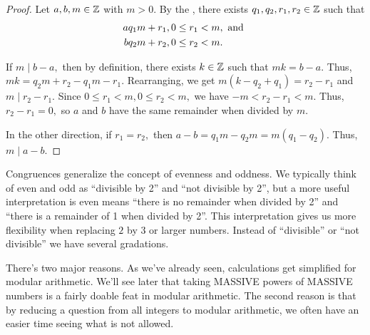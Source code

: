 \documentclass[letterpaper, 11 pt]{ximera}
\begin{document}
\begin{proof}
Let $a,b,m\in\mathbb Z$ with $m> 0.$ By the , there exists $q_1,q_2,r_1,r_2\in\mathbb Z$ such that \begin{align*}
                    a & q_1 m +r_1, 0\leq r_1< m, \textnormal{ and }\\
                    b & q_2 m +r_2, 0\leq r_2< m.
                \end{align*}
            
            
                If $m\mid b-a,$ then by definition, there exists $k\in\mathbb Z$ such that $mk=b-a.$ Thus, $mk=q_2 m+r_2-q_1 m-r_1.$ Rearranging, we get 
                $m(k-q_2+q_1)=r_2-r_1$ and $m\mid r_2-r_1.$ Since 
                $0\leq r_1< m, 0\leq r_2< m,$ we have 
                $-m< r_2-r_1< m.$ Thus, $r_2-r_1=0,$ so $a$ and $b$ have the same remainder when divided by $m$.
            

            
                In the other direction, if $r_1=r_2,$ then $a-b=q_1 m-q_2 m=m(q_1-q_2).$ Thus, $m\mid a-b.$
\end{proof}

Congruences generalize the concept of evenness and oddness. We typically think of even and odd as ``divisible by 2'' and ``not divisible by 2'', but a more useful interpretation is even means ``there is no remainder when divided by 2'' and ``there is a remainder of 1 when divided by 2''. This interpretation gives us more flexibility when replacing $2$ by $3$ or larger numbers. Instead of ``divisible'' or ``not divisible'' we have several gradations.

There's two major reasons. As we've already seen, calculations get simplified for modular arithmetic. We'll see later that taking MASSIVE powers of MASSIVE numbers is a fairly doable feat in modular arithmetic. The second reason is that by reducing a question from all integers to modular arithmetic, we often have an easier time seeing what is not allowed. 
\end{document}
